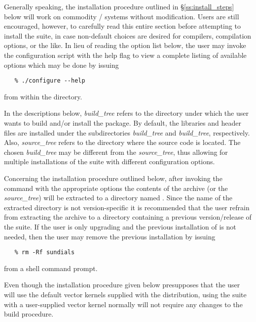 Generally speaking, the installation procedure outlined in
\S\ref{ss:install_steps} below will work on commodity {\linux}/{\unix} systems
without modification. Users are still encouraged, however, to carefully read
this entire section before attempting to install the {\sundials} suite, in case
non-default choices are desired for compilers, compilation options, or the like. 
In lieu of reading the option list below, the user may invoke the configuration
script with the help flag to view a complete listing of available options which
may be done by issuing 
\begin{verbatim}
   % ./configure --help 
\end{verbatim}
from within the  directory.

In the descriptions below, {\em build\_tree} refers to the directory under
which the user wants to build and/or install the {\sundials} package. By
default, the {\sundials} libraries and header files are installed under the
subdirectories {\em build\_tree} and {\em build\_tree},
respectively. Also, {\em source\_tree} refers to the directory where the
{\sundials} source code is located. The chosen {\em build\_tree} may be
different from the {\em source\_tree}, thus allowing for multiple installations
of the {\sundials} suite with different configuration options.

Concerning the installation procedure outlined below, after invoking the
 command with the appropriate options the contents of the
{\sundials} archive (or the {\em source\_tree}) will be extracted to a
directory named . Since the name of the extracted directory
is not version-specific it is recommended that the user refrain from
extracting the archive to a directory containing a previous version/release
of the {\sundials} suite. If the user is only upgrading and the previous 
installation of {\sundials} is not needed, then the user may remove the
previous installation by issuing 
\begin{verbatim}
   % rm -Rf sundials
\end{verbatim}
from a shell command prompt.

Even though the installation procedure given below presupposes that the user
will use the default vector kernels supplied with the distribution, using the
{\sundials} suite with a user-supplied vector kernel normally will not require
any changes to the build procedure.  


